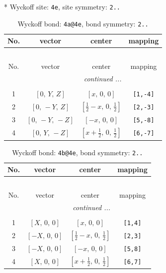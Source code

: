 \documentclass[fleqn,8pt]{jsarticle}
\begin{document}
* Wyckoff site: {\tt 4e}, site symmetry: {\tt 2..}
\renewcommand{\arraystretch}{1.2}
\begin{longtable}{cccc}
\caption{Wyckoff bond: {\tt 4a@4e}, bond symmetry: {\tt 2..}}
 \\
 \hline \hline
No. & vector & center & mapping \\ \hline \endfirsthead

\multicolumn{3}{l}{\tablename\ \thetable{}} \\
 \hline \hline
No. & vector & center & mapping \\ \hline \endhead

 \hline \hline
\multicolumn{3}{r}{\footnotesize\it continued ...} \\ \endfoot

 \hline \hline
\multicolumn{3}{r}{} \\ \endlastfoot

1 & $\left[ 0,\, Y,\, Z \right]$ & $\left[ x,\, 0,\, 0 \right]$ & {\tt [1,-4]} \\ \hline
2 & $\left[ 0,\, - Y,\, Z \right]$ & $\left[ \frac{1}{2} - x,\, 0,\, \frac{1}{2} \right]$ & {\tt [2,-3]} \\ \hline
3 & $\left[ 0,\, - Y,\, - Z \right]$ & $\left[ - x,\, 0,\, 0 \right]$ & {\tt [5,-8]} \\ \hline
4 & $\left[ 0,\, Y,\, - Z \right]$ & $\left[ x + \frac{1}{2},\, 0,\, \frac{1}{2} \right]$ & {\tt [6,-7]} \\
\end{longtable}
\renewcommand{\arraystretch}{1.2}
\begin{longtable}{cccc}
\caption{Wyckoff bond: {\tt 4b@4e}, bond symmetry: {\tt 2..}}
 \\
 \hline \hline
No. & vector & center & mapping \\ \hline \endfirsthead

\multicolumn{3}{l}{\tablename\ \thetable{}} \\
 \hline \hline
No. & vector & center & mapping \\ \hline \endhead

 \hline \hline
\multicolumn{3}{r}{\footnotesize\it continued ...} \\ \endfoot

 \hline \hline
\multicolumn{3}{r}{} \\ \endlastfoot

1 & $\left[ X,\, 0,\, 0 \right]$ & $\left[ x,\, 0,\, 0 \right]$ & {\tt [1,4]} \\ \hline
2 & $\left[ - X,\, 0,\, 0 \right]$ & $\left[ \frac{1}{2} - x,\, 0,\, \frac{1}{2} \right]$ & {\tt [2,3]} \\ \hline
3 & $\left[ - X,\, 0,\, 0 \right]$ & $\left[ - x,\, 0,\, 0 \right]$ & {\tt [5,8]} \\ \hline
4 & $\left[ X,\, 0,\, 0 \right]$ & $\left[ x + \frac{1}{2},\, 0,\, \frac{1}{2} \right]$ & {\tt [6,7]} \\
\end{longtable}
\end{document}
